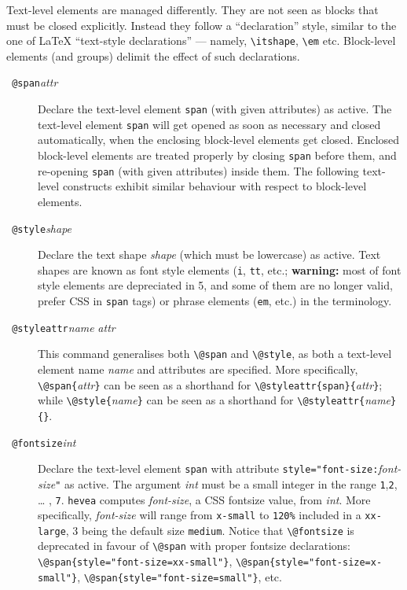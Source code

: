 Text-level elements are managed differently. They are not seen
as blocks that must be closed explicitly.
Instead they follow a ``declaration'' style, similar
to the one of \LaTeX{} ``text-style declarations'' --- namely,
\verb+\itshape+, \verb+\em+ etc.
Block-level elements (and \html{} groups)
delimit the effect of such declarations.
\begin{description}
\item[{{\tt{} @span}{\it attr}{\tt{}}}]
Declare the text-level element \verb+span+ (with given attributes)
as active.
The text-level element \verb+span+ will get opened as soon as
necessary and closed automatically, when the
enclosing block-level elements get closed.
Enclosed block-level elements are treated properly by closing \verb+span+
before them, and re-opening \verb+span+ (with given attributes)
inside them.
The following text-level constructs exhibit similar behaviour with respect
to block-level elements.

\item[{\tt{} @style}{\it shape}{\tt{}}] Declare the
text shape \textit{shape} (which must be lowercase) as active. Text
shapes are known as font style elements (\verb+i+, \verb+tt+, etc.;
\textbf{warning:} most of font style elements are depreciated in \html{}5,
and some of them are no longer valid, prefer CSS in \verb+span+ tags)
or phrase elements (\verb+em+, etc.) in the \html{} terminology.


\item[{\tt{} @styleattr}{\it name}{\tt{}}{\it
attr}{\tt{}}]
This command generalises both \verb+\@span+ and \verb+\@style+,
as both a text-level element name \textit{name} and attributes are specified.
More specifically, 
\verb+\@span{+\textit{attr}\verb+}+ can be seen as a shorthand for
\verb+\@styleattr{span}{+\textit{attr}\verb+}+;
while
\verb+\@style{+\textit{name}\verb+}+ can be seen as
a shorthand for
\verb+\@styleattr{+\textit{name}\verb+}{}+.

\item[{\tt{} @fontsize}{\it int}{\tt{}}] Declare
the text-level element \verb+span+ with attribute
\verb+style="font-size:+\textit{font-size}\verb+"+ as active.
The argument
\textit{int} must be a small integer in the range
\texttt{1},\texttt{2}, \ldots{} , \texttt{7}.
\texttt{hevea} computes \textit{font-size}, a CSS fontsize value,
 from \textit{int}.
More specifically, \textit{font-size} will
range from \verb+x-small+ to \verb+120%+ included in
a \verb+xx-large+, 3 being the  default size \verb+medium+.
Notice that \verb+\@fontsize+ is deprecated in favour of
\verb+\@span+ with proper fontsize declarations:
\verb+\@span{style="font-size=xx-small"}+,
\verb+\@span{style="font-size=x-small"}+,
\verb+\@span{style="font-size=small"}+,
etc.



\end{description}
